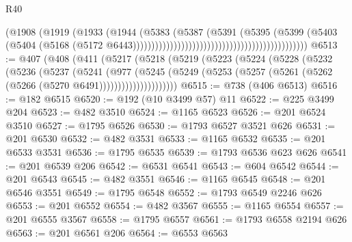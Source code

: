 \begin{lexlean}{R40}
\begin{coremodule}
                                                                        (@1908
                                                                          (@1919
                                                                            (@1933
                                                                              (@1944
                                                                                (@5383
                                                                                  (@5387
                                                                                    (@5391
                                                                                      (@5395
                                                                                        (@5399
                                                                                          (@5403
                                                                                            (@5404
                                                                                              (@5168
                                                                                                (@5172
                                                                                                  @6443)))))))))))))))))))))))))))))))))))))))))))))))
@6513 := @407
    (@408
      (@411
        (@5217
          (@5218
            (@5219
              (@5223
                (@5224
                  (@5228
                    (@5232
                      (@5236
                        (@5237
                          (@5241
                            (@977
                              (@5245
                                (@5249
                                  (@5253
                                    (@5257 (@5261 (@5262 (@5266 (@5270 @6491)))))))))))))))))))))
@6515 := @738 (@406 @6513)
@6516 := @182 @6515
@6520 := @192 (@10 @3499 @57) @11
@6522 := @225 @3499 @204
@6523 := @482 @3510
@6524 := @1165 @6523
@6526 := @201 @6524 @3510
@6527 := @1795 @6526
@6530 := @1793 @6527 @3521 @626
@6531 := @201 @6530
@6532 := @482 @3531
@6533 := @1165 @6532
@6535 := @201 @6533 @3531
@6536 := @1795 @6535
@6539 := @1793 @6536 @623 @626
@6541 := @201 @6539 @206
@6542 := @6531 @6541
@6543 := @604 @6542
@6544 := @201 @6543
@6545 := @482 @3551
@6546 := @1165 @6545
@6548 := @201 @6546 @3551
@6549 := @1795 @6548
@6552 := @1793 @6549 @2246 @626
@6553 := @201 @6552
@6554 := @482 @3567
@6555 := @1165 @6554
@6557 := @201 @6555 @3567
@6558 := @1795 @6557
@6561 := @1793 @6558 @2194 @626
@6563 := @201 @6561 @206
@6564 := @6553 @6563

\end{coremodule}
\end{lexlean}
